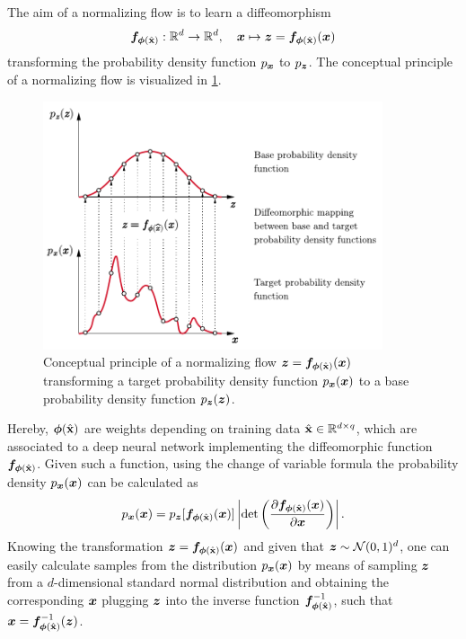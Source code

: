 \documentclass[a4paper,12pt]{report}
\begin{document}
The aim of a normalizing flow is to learn a diffeomorphism \begin{equation}
\bm{f}_{\bm{\phi}(\hat{\boldsymbol{\mathbf{x}}})}:\mathbb{R}^d \rightarrow \mathbb{R}^d, \quad \bm{x} \mapsto \bm{z} = \bm{f}_{\bm{\phi}(\hat{\boldsymbol{\mathbf{x}}})}(\bm{x})
\end{equation} transforming the probability density function $p_{\bm{x}}$ to $p_{\bm{z}}$. The conceptual principle of a normalizing flow is visualized in \cref{fig:normflow}. 
\begin{figure}[h]
\centering
\includegraphics[width=10cm]{figures/normflow.pdf}
\caption{Conceptual principle of a normalizing flow $\bm{z} = \bm{f}_{\bm{\phi}(\hat{\boldsymbol{\mathbf{x}}})}(\bm{x})$ transforming a target probability density function $p_{\bm{x}}(\bm{x})$ to a base probability density function $p_{\bm{z}}(\bm{z})$.}
\label{fig:normflow}
\end{figure}
Hereby, $\bm{\phi}(\hat{\boldsymbol{\mathbf{x}}})$ are weights depending on training data $\hat{\boldsymbol{\mathbf{x}}} \in \mathbb{R}^{d\times q}$, which are associated to a deep neural network implementing the diffeomorphic function $\bm{f}_{\bm{\phi}(\hat{\boldsymbol{\mathbf{x}}})}$. Given such a function, using the change of variable formula the probability density $p_{\bm{x}}(\bm{x})$ can be calculated as \begin{equation}
p_{\bm{x}}(\bm{x}) = p_{\bm{z}}[\bm{f}_{\bm{\phi}(\hat{\boldsymbol{\mathbf{x}}})}(\bm{x})]\left|\det\left(\frac{\partial \bm{f}_{\bm{\phi}(\hat{\boldsymbol{\mathbf{x}}})}(\bm{x})}{\partial \bm{x}}\right)\right|.
\end{equation} Knowing the transformation $\bm{z} = \bm{f}_{\bm{\phi}(\hat{\boldsymbol{\mathbf{x}}})}(\bm{x})$ and given that $\bm{z} \sim \mathcal{N}(0,1)^d$, one can easily calculate samples from the distribution $p_{\bm{x}}(\bm{x})$ by means of sampling $\bm{z}$ from a $d$-dimensional standard normal distribution and obtaining the corresponding $\bm{x}$ plugging $\bm{z}$ into the inverse function $\bm{f}_{\bm{\phi}(\hat{\boldsymbol{\mathbf{x}}})}^{-1}$, such that $\bm{x} = \bm{f}_{\bm{\phi}(\hat{\boldsymbol{\mathbf{x}}})}^{-1}(\bm{z})$.
\end{document}
